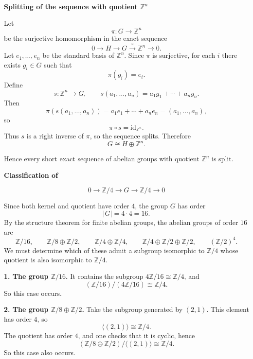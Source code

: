 \begin{solution}

\medskip
\noindent\textbf{Splitting of the sequence with quotient \(\mathbb Z^n\)}\par
\smallskip


\noindent
Let
\[
\pi:G\to \mathbb Z^n
\]
be the surjective homomorphism in the exact sequence
\[
0\to H\to G\overset{\pi}{\to}\mathbb Z^n\to 0.
\]
Let \(e_1,\dots,e_n\) be the standard basis of \(\mathbb Z^n\). Since \(\pi\) is surjective, for each \(i\) there exists \(g_i\in G\) such that
\[
\pi(g_i)=e_i.
\]
Define
\[
s:\mathbb Z^n\to G,
\qquad
s(a_1,\dots,a_n)=a_1g_1+\cdots+a_ng_n.
\]
Then
\[
\pi(s(a_1,\dots,a_n))
=
a_1e_1+\cdots+a_ne_n
=
(a_1,\dots,a_n),
\]
so
\[
\pi\circ s=\mathrm{id}_{\mathbb Z^n}.
\]
Thus \(s\) is a right inverse of \(\pi\), so the sequence splits. Therefore
\[
G\cong H\oplus \mathbb Z^n.
\]

Hence every short exact sequence of abelian groups with quotient \(\mathbb Z^n\) is split.


\medskip
\noindent\textbf{Classification of}\par
\smallskip

\[
0\longrightarrow \mathbb Z/4 \longrightarrow G \longrightarrow \mathbb Z/4 \longrightarrow 0
\]

\noindent
Since both kernel and quotient have order \(4\), the group \(G\) has order
\[
|G|=4\cdot 4=16.
\]
By the structure theorem for finite abelian groups, the abelian groups of order \(16\) are
\[
\mathbb Z/16,\qquad
\mathbb Z/8\oplus \mathbb Z/2,\qquad
\mathbb Z/4\oplus \mathbb Z/4,\qquad
\mathbb Z/4\oplus \mathbb Z/2\oplus \mathbb Z/2,\qquad
(\mathbb Z/2)^4.
\]
We must determine which of these admit a subgroup isomorphic to \(\mathbb Z/4\) whose quotient is also isomorphic to \(\mathbb Z/4\).

\par

\noindent
\textbf{1. The group \(\mathbb Z/16\).}
It contains the subgroup \(4\mathbb Z/16\cong \mathbb Z/4\), and
\[
(\mathbb Z/16)/(4\mathbb Z/16)\cong \mathbb Z/4.
\]
So this case occurs.

\par

\noindent
\textbf{2. The group \(\mathbb Z/8\oplus \mathbb Z/2\).}
Take the subgroup generated by \((2,1)\). This element has order \(4\), so
\[
\langle (2,1)\rangle \cong \mathbb Z/4.
\]
The quotient has order \(4\), and one checks that it is cyclic, hence
\[
(\mathbb Z/8\oplus \mathbb Z/2)/\langle (2,1)\rangle \cong \mathbb Z/4.
\]
So this case also occurs.


\end{solution}
